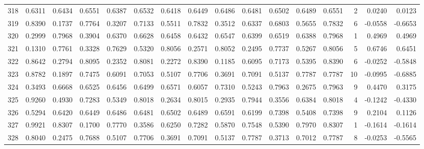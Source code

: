 \begin{tabular}{lrrrrrrrrrrrrrrr}
318 &      0.6311 &  0.6434 &  0.6551 &  0.6387 &  0.6532 &  0.6418 &  0.6449 &  0.6486 &  0.6481 &  0.6502 &   0.6489 &     0.6551 &      2 &                    0.0240 &                     0.0123 \\
319 &      0.8390 &  0.1737 &  0.7764 &  0.3207 &  0.7133 &  0.5511 &  0.7832 &  0.3512 &  0.6337 &  0.6803 &   0.5655 &     0.7832 &      6 &                   -0.0558 &                    -0.6653 \\
320 &      0.2999 &  0.7968 &  0.3904 &  0.6370 &  0.6628 &  0.6458 &  0.6432 &  0.6547 &  0.6399 &  0.6519 &   0.6388 &     0.7968 &      1 &                    0.4969 &                     0.4969 \\
321 &      0.1310 &  0.7761 &  0.3328 &  0.7629 &  0.5320 &  0.8056 &  0.2571 &  0.8052 &  0.2495 &  0.7737 &   0.5267 &     0.8056 &      5 &                    0.6746 &                     0.6451 \\
322 &      0.8642 &  0.2794 &  0.8095 &  0.2352 &  0.8081 &  0.2272 &  0.8390 &  0.1185 &  0.6095 &  0.7173 &   0.5395 &     0.8390 &      6 &                   -0.0252 &                    -0.5848 \\
323 &      0.8782 &  0.1897 &  0.7475 &  0.6091 &  0.7053 &  0.5107 &  0.7706 &  0.3691 &  0.7091 &  0.5137 &   0.7787 &     0.7787 &     10 &                   -0.0995 &                    -0.6885 \\
324 &      0.3493 &  0.6668 &  0.6525 &  0.6456 &  0.6499 &  0.6571 &  0.6057 &  0.7310 &  0.5243 &  0.7963 &   0.2675 &     0.7963 &      9 &                    0.4470 &                     0.3175 \\
325 &      0.9260 &  0.4930 &  0.7283 &  0.5349 &  0.8018 &  0.2634 &  0.8015 &  0.2935 &  0.7944 &  0.3556 &   0.6384 &     0.8018 &      4 &                   -0.1242 &                    -0.4330 \\
326 &      0.5294 &  0.6420 &  0.6449 &  0.6486 &  0.6481 &  0.6502 &  0.6489 &  0.6591 &  0.6199 &  0.7398 &   0.5408 &     0.7398 &      9 &                    0.2104 &                     0.1126 \\
327 &      0.9921 &  0.8307 &  0.1700 &  0.7770 &  0.3586 &  0.6250 &  0.7282 &  0.5870 &  0.7548 &  0.5390 &   0.7970 &     0.8307 &      1 &                   -0.1614 &                    -0.1614 \\
328 &      0.8040 &  0.2475 &  0.7688 &  0.5107 &  0.7706 &  0.3691 &  0.7091 &  0.5137 &  0.7787 &  0.3713 &   0.7012 &     0.7787 &      8 &                   -0.0253 &                    -0.5565 \\

\end{tabular}
